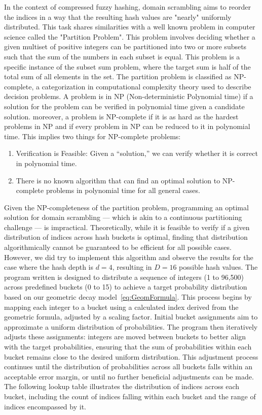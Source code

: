 In the context of compressed fuzzy hashing, domain scrambling aims to reorder the indices in a way that the resulting hash values are "nearly" uniformly distributed. This task shares similarities with a well known problem in computer science called the "Partition Problem". This problem involves deciding whether a given multiset of positive integers can be partitioned into two or more subsets such that the sum of the numbers in each subset is equal. This problem is a specific instance of the subset sum problem, where the target sum is half of the total sum of all elements in the set. The partition problem is classified as NP-complete, a categorization in computational complexity theory used to describe decision problems. A problem is in NP (Non-deterministic Polynomial time) if a solution for the problem can be verified in polynomial time given a candidate solution. moreover, a problem is NP-complete if it is as hard as the hardest problems in NP and if every problem in NP can be reduced to it in polynomial time. This implies two things for NP-complete problems:

\begin{enumerate}
    \item Verification is Feasible: Given a ``solution,'' we can verify whether it is correct in polynomial time.
    \item There is no known algorithm that can find an optimal solution to NP-complete problems in polynomial time for all general cases.
\end{enumerate}

Given the NP-completeness of the partition problem, programming an optimal solution for domain scrambling — which is akin to a continuous partitioning challenge — is impractical. Theoretically, while it is feasible to verify if a given distribution of indices across hash buckets is optimal, finding that distribution algorithmically cannot be guaranteed to be efficient for all possible cases. However, we did try to implement this algorithm and observe the results for the case where the hash depth is \(d=4\), resulting in \(D=16\) possible hash values. The program written is designed to distribute a sequence of integers (1 to 96,500) across predefined buckets (0 to 15) to achieve a target probability distribution based on our geometric decay model~\ref{eq:GeomFormula}. This process begins by mapping each integer to a bucket using a calculated index derived from the geometric formula, adjusted by a scaling factor. Initial bucket assignments aim to approximate a uniform distribution of probabilities. The program then iteratively adjusts these assignments: integers are moved between buckets to better align with the target probabilities, ensuring that the sum of probabilities within each bucket remains close to the desired uniform distribution. This adjustment process continues until the distribution of probabilities across all buckets falls within an acceptable error margin, or until no further beneficial adjustments can be made. The following lookup table illustrates the distribution of indices across each bucket, including the count of indices falling within each bucket and the range of indices encompassed by it.



